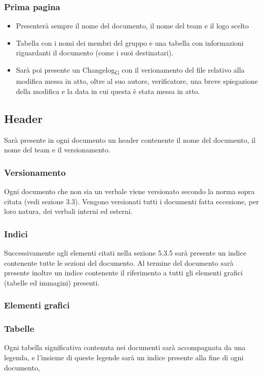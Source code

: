 \documentclass{article}
\begin{document}
\subsubsection*{Prima pagina}
\begin{itemize}
    \item Presenterà sempre il nome del documento, il nome del team e il logo scelto
    \item Tabella con i nomi dei membri del gruppo e una tabella con informazioni riguardanti il documento (come i suoi destinatari).
    \item Sarà poi presente un Changelog\textsubscript{G} con il verionamento del file relativo alla modifica messa in atto, oltre al suo autore, verificatore, una breve spiegazione della modifica e la data in cui questa è stata messa in atto.
\end{itemize}

\subsection{Header}
Sarà presente in ogni documento un header contenente il nome del documento, il nome del team e il versionamento.
\subsubsection*{Versionamento}
Ogni documento che non sia un verbale viene versionato secondo la norma sopra citata (vedi sezione 3.3). Vengono versionati tutti i documenti fatta eccezione, per loro natura, dei verbali interni ed esterni.
\subsubsection*{Indici}
Successivamente agli elementi citati nella sezione 5.3.5 sarà presente un indice contenente tutte le sezioni del documento. Al termine del documento sarà presente inoltre un indice contenente il riferimento a tutti gli elementi grafici (tabelle ed immagini) presenti. 

\subsubsection{Elementi grafici}
\subsubsection{Tabelle}
Ogni tabella significativa contenuta nei documenti sarà accompagnata da una legenda, e l'insieme di queste legende sarà un indice presente alla fine di ogni documento,
\end{document}
